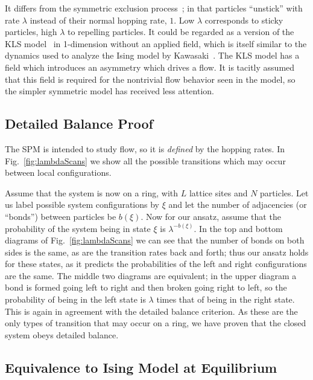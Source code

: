 \documentclass[
reprint, amsmath,amssymb,
]{revtex4-1}
\begin{document}
It differs from the symmetric exclusion
process~\cite{sugden2007dynamically, Kollmann2003, Lin2005,
  Hegde2014,Krapivsky2014, Imamura2017}; in that particles ``unstick''
with rate $\lambda$ instead of their normal hopping rate, $1$.  Low
$\lambda$ corresponds to sticky particles, high $\lambda$ to repelling
particles.
It could be regarded as a version of the KLS model~\cite{Katz1984,
  Zia2010, Kafri2003} in 1-dimension without an applied field, which
is itself similar to the dynamics used to analyze the Ising model by
Kawasaki~\cite{PhysRev.145.224}.  The KLS model has a field which
introduces an asymmetry which drives a flow.  It is tacitly assumed
that this field is required for the nontrivial flow behavior seen in
the model, so the simpler symmetric model has received less attention.


\subsection{Detailed Balance Proof} 
The SPM is intended to study flow, so it is {\it defined} by the
hopping rates.  In Fig.~\ref{fig:lambdaScans} we
show all the possible transitions which may occur between local
configurations. 

Assume that the system is now on a ring, with $L$
lattice sites and $N$ particles.  Let us label possible system
configurations by $\xi$ and let the number of adjacencies (or
``bonds'') between particles be $b(\xi)$. Now for our ansatz, assume
that the probability of the system being in state $\xi$ is
$\lambda^{-b(\xi)}$.  In the top and bottom diagrams of
Fig.~\ref{fig:lambdaScans} we can see that the number of bonds on
both sides is the same, as are the transition rates back and forth;
thus our ansatz holds for these states, as it predicts the
probabilities of the left and right configurations are the same. The
middle two diagrams are equivalent; in the upper diagram a
bond is formed going left to right and then broken going right to
left, so the probability of being in the left state is $\lambda$ times
that of being in the right state. This is again in agreement with the
detailed balance criterion. As these are the only types of transition
that may occur on a ring, we have proven that the closed system obeys
detailed balance.

\subsection{Equivalence to Ising Model at Equilibrium}
\end{document}
